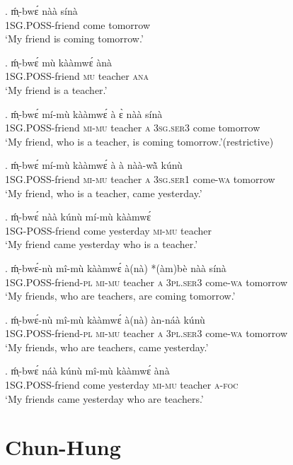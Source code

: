 \documentclass{assets/fieldnotes}
\begin{document}
\exg. ḿ̩-bwɛ́ nàà sínà\\
\textsc{1SG.POSS}-friend come tomorrow\\
`My friend is coming tomorrow.’

\exg. ḿ̩-bwɛ́ mù kààmwɛ́ ànà\\
\textsc{1SG.POSS}-friend \textsc{mu} teacher \textsc{ana}\\
`My friend is a teacher.’

\exg. ḿ̩-bwɛ́ mí-mù kààmwɛ́ à ɛ̀ nàà sínà\\
\textsc{1SG.POSS}-friend \textsc{mi-mu} teacher \textsc{a} \textsc{3sg.ser3} come tomorrow\\
`My friend, who is a teacher, is coming tomorrow.’\hfill{(restrictive)}

\exg. ḿ̩-bwɛ́ mí-mù kààmwɛ́ à à nàà-wã̀ kúnù\\
\textsc{1SG.POSS}-friend \textsc{mi-mu} teacher \textsc{a} \textsc{3sg.ser1} come-\textsc{wa} tomorrow\\
`My friend, who is a teacher, came yesterday.’

\exg. ḿ̩-bwɛ́ nàà kúnù mí-mù kààmwɛ́\\
\textsc{1SG-POSS}-friend come yesterday \textsc{mi-mu} teacher\\
`My friend came yesterday who is a teacher.’

\exg. ḿ̩-bwɛ́-nù mî-mù kààmwɛ́ à(nà) *(àm)bè nàà sínà\\
\textsc{1SG.POSS}-friend-\textsc{pl} \textsc{mi-mu} teacher \textsc{a} \textsc{3pl.ser3} come-\textsc{wa} tomorrow\\
`My friends, who are teachers, are coming tomorrow.’

\exg. ḿ̩-bwɛ́-nù mî-mù kààmwɛ́ à(nà) àn-náà kúnù\\
\textsc{1SG.POSS}-friend-\textsc{pl} \textsc{mi-mu} teacher \textsc{a} \textsc{3pl.ser3} come-\textsc{wa} tomorrow\\
`My friends, who are teachers, came yesterday.’

\exg. ḿ̩-bwɛ́ náà kúnù mî-mù kààmwɛ́ ànà\\
\textsc{1SG.POSS}-friend come yesterday \textsc{mi-mu} teacher \textsc{a-foc}\\
`My friends came yesterday who are teachers.’


\section{Chun-Hung}
\end{document}
